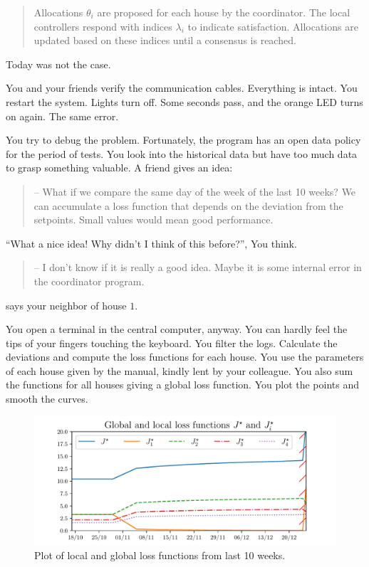 \documentclass[../main.tex]{subfiles}
\begin{document}
\begin{quote}
  \raggedright
  Allocations $\theta_{i}$ are proposed for each house by the coordinator.
  The local controllers respond with indices $\lambda_{i}$ to indicate satisfaction. Allocations are updated based on these indices until a consensus is reached.
\end{quote}
Today was not the case.

You and your friends verify the communication cables.
Everything is intact. You restart the system.
Lights turn off. Some seconds pass, and the orange LED turns on again.
The same error.

You try to debug the problem.
Fortunately, the program has an open data policy for the period of tests.
You look into the historical data but have too much data to grasp something valuable.
A friend gives an idea:
\begin{quote}
  -- What if we compare the same day of the week of the last 10 weeks? We can accumulate a loss function that depends on the deviation from the setpoints.
  Small values would mean good performance.
\end{quote}

``What a nice idea! Why didn't I think of this before?'', You think.
\begin{quote}
-- I don't know if it is really a good idea. Maybe it is some internal error in the coordinator program.
\end{quote}
says your neighbor of house $1$.

You open a terminal in the central computer, anyway.
You can hardly feel the tips of your fingers touching the keyboard.
You filter the logs. Calculate the deviations and compute the loss functions for each house. You use the parameters of each house given by the manual, kindly lent by your colleague.
You also sum the functions for all houses giving a global loss function.
You plot the points and smooth the curves.
\begin{figure}[H]
  \centering
  \includegraphics[width=.8\textwidth]{../img/example_introduction/example_J.pdf}
  \caption{Plot of local and global loss functions from last 10 weeks.}\label{fig:change_in_j}
\end{figure}
\end{document}
